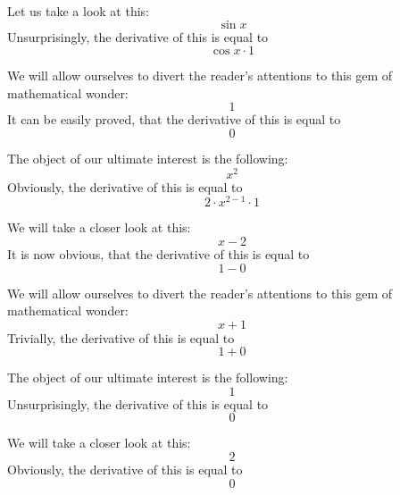 \documentclass{article}
\begin{document}
Let us take a look at this:
\begin{equation}
\sin x 
\end{equation}
Unsurprisingly, the derivative of this is equal to
\begin{equation}
\cos x \cdot 1 
\end{equation}

We will allow ourselves to divert the reader's attentions to this gem of mathematical wonder:
\begin{equation}
1 
\end{equation}
It can be easily proved, that the derivative of this is equal to
\begin{equation}
0 
\end{equation}

The object of our ultimate interest is the following:
\begin{equation}
x ^{2 } 
\end{equation}
Obviously, the derivative of this is equal to
\begin{equation}
2 \cdot x ^{2 - 1 } \cdot 1 
\end{equation}

We will take a closer look at this:
\begin{equation}
x - 2 
\end{equation}
It is now obvious, that the derivative of this is equal to
\begin{equation}
1 - 0 
\end{equation}

We will allow ourselves to divert the reader's attentions to this gem of mathematical wonder:
\begin{equation}
x + 1 
\end{equation}
Trivially, the derivative of this is equal to
\begin{equation}
1 + 0 
\end{equation}

The object of our ultimate interest is the following:
\begin{equation}
1 
\end{equation}
Unsurprisingly, the derivative of this is equal to
\begin{equation}
0 
\end{equation}

We will take a closer look at this:
\begin{equation}
2 
\end{equation}
Obviously, the derivative of this is equal to
\begin{equation}
0 
\end{equation}
\end{document}

